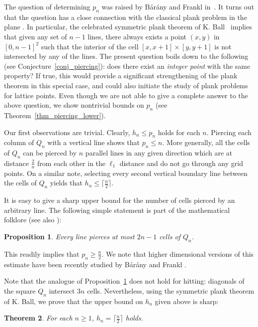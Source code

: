 \documentclass[11pt,a4paper]{amsart}
\newtheorem{theorem}{Theorem}
\newtheorem{prop}[theorem]{Proposition}
\begin{document}
The question of determining $p_n$ was raised by Bárány and Frankl in~\cite{BF21, BF21+}.
It turns out that the question has a close connection with the classical plank problem in the plane \cite{B51, T32}. In particular, the celebrated symmetric plank theorem of K. Ball~\cite{B91} implies that given any set of $n-1$ lines, there always exists a point $(x,y)$ in $[0,n-1]^2$ such that the interior of the cell $[x, x+1] \times [y,y+1]$ is not intersected by any of the lines. The present question boils down to the following (see Conjecture~\ref{conj_piercing}): does there exist an {\em integer point} with the same property? If true, this would provide a significant strengthening of the plank theorem in this special case, and could also initiate the study of  plank problems for lattice points. Even though we are not able to give a complete answer to the above question, we show nontrivial bounds on $p_n$ (see Theorem~\ref{thm_piercing_lower}).




Our first observations are trivial. Clearly, $h_n \leq p_n$ holds for each $n$. Piercing each column of $Q_n$ with a vertical line shows that $p_n \leq n$. More generally, all the cells of $Q_n$ can be pierced by $n$ parallel lines in any given direction which are at distance $\frac 2 n$ from each other in the $\ell_1$ distance and do not go through any grid points.
On a similar note, selecting every second vertical boundary line between the cells of $Q_n$ yields that $h_n \leq \lceil \frac{n}{2} \rceil$.


It is easy to give a sharp upper bound for the number of cells pierced by an arbitrary line. The following simple statement is part of the mathematical folklore (see also \cite{B83}):
\begin{prop}\label{prop_line}
 Every line pierces at most $2n -1$ cells of $Q_n$.
\end{prop}
This readily implies that $p_n \geq \frac{n}{2}$. We note that higher dimensional versions of this estimate have been recently studied by Bárány and Frankl \cite{BF21, BF21+}.



Note that the analogue of Proposition~\ref{prop_line} does not hold for hitting: diagonals of the square $Q_n$ intersect $3n$ cells. Nevertheless, using the  symmetric plank theorem of K. Ball, we prove that the upper bound on $h_n$ given above is sharp:

\begin{theorem}\label{thm_hitting}
  For each $n \geq 1$, $h_n =  \lceil \frac{n}{2} \rceil$ holds.
\end{theorem}
\end{document}
